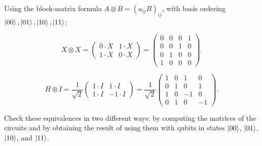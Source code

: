 \documentclass{ceri/sty/rapport}
\newcounter{exercice}[section]
\begin{document}
\begin{solution}
Using the block-matrix formula $A\otimes B = (a_{ij}B)_{ij}$, with basis ordering
$\ket{00},\ket{01},\ket{10},\ket{11}$:

\[
  X\otimes X =
  \begin{pmatrix}0\cdot X & 1\cdot X\\1\cdot X & 0\cdot X\end{pmatrix}
  =\begin{pmatrix}0&0&0&1\\0&0&1&0\\0&1&0&0\\1&0&0&0\end{pmatrix}.
\]

\[
  H\otimes I = \frac{1}{\sqrt{2}}
  \begin{pmatrix}1\cdot I & 1\cdot I\\1\cdot I & -1\cdot I\end{pmatrix}
  =\frac{1}{\sqrt{2}}\begin{pmatrix}1&0&1&0\\0&1&0&1\\1&0&-1&0\\0&1&0&-1\end{pmatrix}.
\]
\end{solution}

\begin{exercice}[p.~30]
Check these equivalences in two different ways: by computing the matrices of
the circuits and by obtaining the result of using them with qubits in states
$\ket{00}$, $\ket{01}$, $\ket{10}$, and $\ket{11}$.
\end{exercice}
\end{document}
